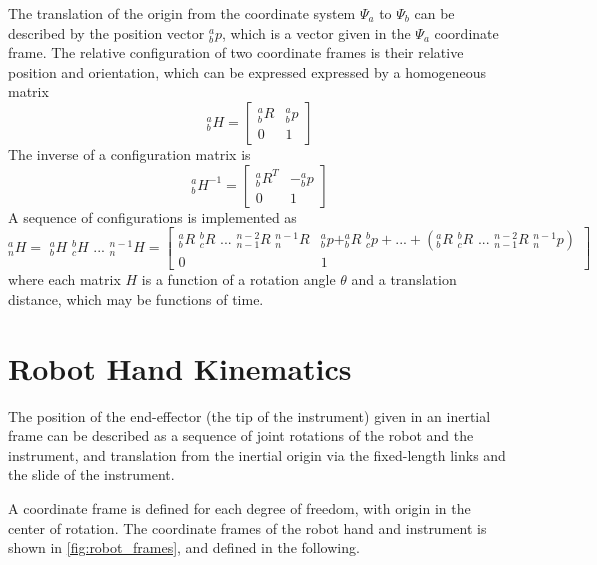 The translation of the origin from the coordinate system $\Psi_a$ to $\Psi_b$ can be described by the position vector $^a_bp$, which is a vector given in the $\Psi_a$ coordinate frame.
The relative configuration of two coordinate frames is their relative position and orientation, which can be expressed expressed by a homogeneous matrix
\begin{equation}
^a_bH = 
\begin{bmatrix}
^a_bR & ^a_bp\\
0 & 1
\end{bmatrix}
\end{equation}
The inverse of a configuration matrix is
\begin{equation}
^a_bH^{-1} = 
\begin{bmatrix}
^a_bR^T & -^a_bp\\
0 & 1
\end{bmatrix}
\end{equation}
A sequence of configurations is implemented as
\begin{equation}
^a_nH =\,\, ^a_bH \,\, ^b_cH \,\,...\,\, ^{n-1}_nH = 
\begin{bmatrix}
^a_bR \,\, ^b_cR \,\,...\,\, ^{n-2}_{n-1}R \,\,^{n-1}_nR & ^a_bp + ^a_bR \,\, ^b_cp + ... + (^a_bR\,\, ^b_cR \,\,...\,\, ^{n-2}_{n-1}R \,\, ^{n-1}_np )\\
0 & 1
\end{bmatrix}
\end{equation}
where each matrix $H$ is a function of a rotation angle $\theta$ and a translation distance, which may be functions of time.


 



\section{Robot Hand Kinematics}
The position of the end-effector (the tip of the instrument) given in an inertial frame can be described as a sequence of joint rotations of the robot and the instrument, and translation from the inertial origin via the fixed-length links and the slide of the instrument.

A coordinate frame is defined for each degree of freedom, with origin in the center of rotation. The coordinate frames of the robot hand and instrument is shown in \autoref{fig:robot_frames}, and defined in the following.

